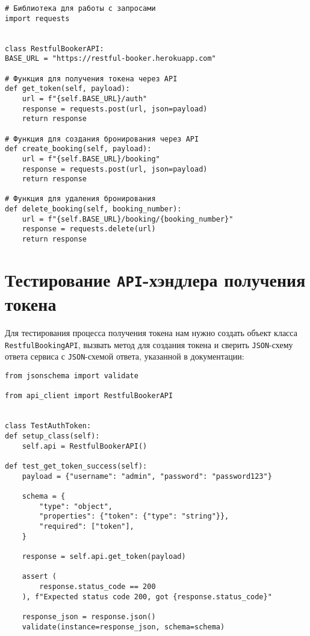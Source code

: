 \begin{verbatim}
# Библиотека для работы с запросами
import requests


class RestfulBookerAPI:
BASE_URL = "https://restful-booker.herokuapp.com"

# Функция для получения токена через API
def get_token(self, payload):
    url = f"{self.BASE_URL}/auth"
    response = requests.post(url, json=payload)
    return response

# Функция для создания бронирования через API
def create_booking(self, payload):
    url = f"{self.BASE_URL}/booking"
    response = requests.post(url, json=payload)
    return response

# Функция для удаления бронирования
def delete_booking(self, booking_number):
    url = f"{self.BASE_URL}/booking/{booking_number}"
    response = requests.delete(url)
    return response
\end{verbatim}

\section{Тестирование \texttt{API}-хэндлера получения токена}

Для тестирования процесса получения токена нам нужно создать объект класса \texttt{RestfulBookingAPI}, вызвать метод для создания токена и сверить \texttt{JSON}-схему ответа сервиса с \texttt{JSON}-схемой ответа, указанной в документации:

\begin{verbatim}
from jsonschema import validate

from api_client import RestfulBookerAPI


class TestAuthToken:
def setup_class(self):
    self.api = RestfulBookerAPI()

def test_get_token_success(self):
    payload = {"username": "admin", "password": "password123"}

    schema = {
        "type": "object",
        "properties": {"token": {"type": "string"}},
        "required": ["token"],
    }

    response = self.api.get_token(payload)

    assert (
        response.status_code == 200
    ), f"Expected status code 200, got {response.status_code}"

    response_json = response.json()
    validate(instance=response_json, schema=schema)
\end{verbatim}

